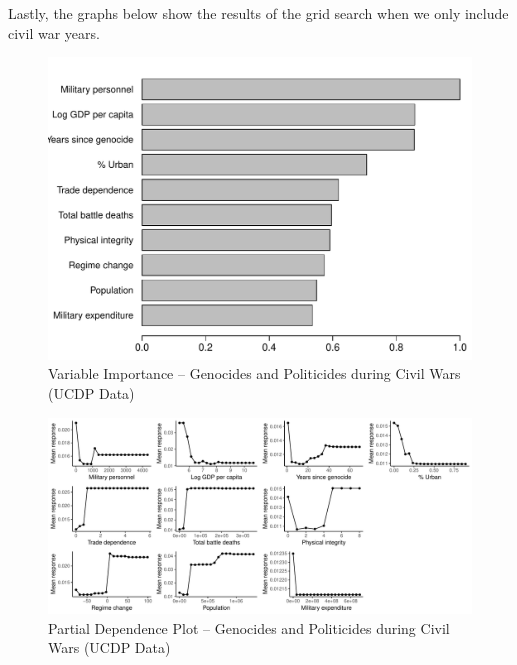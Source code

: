 Lastly, the graphs below show the results of the grid search when we only include civil war years. 

\begin{figure}[H]
    \centering
    \includegraphics[width=.85\textwidth]{images/rf-uamk-ucdp.pdf}
    \caption{Variable Importance -- Genocides and Politicides during Civil Wars (UCDP Data)}
    \label{fig:rf-mk-ucdp}
\end{figure}

\newpage 

\clearpage
\begin{figure}
    \centering
    \includegraphics[width=\textwidth]{images/rf-uamk-ucdp-pd.pdf}
    \caption{Partial Dependence Plot -- Genocides and Politicides during Civil Wars (UCDP Data)}
    \label{fig:rf-mk-ucdp-pd}
\end{figure}
\clearpage


